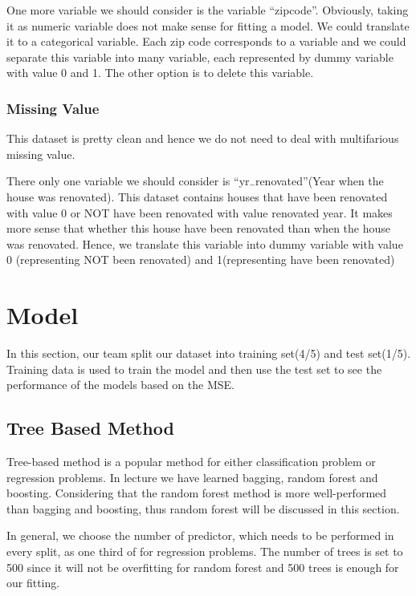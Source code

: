 \documentclass[12pt,twocolumn,twoside]{article}
\begin{document}
One more variable we should consider is the variable “zipcode”. Obviously, taking it as numeric variable does not make sense for fitting a model. We could translate it to a categorical variable. Each zip code corresponds to a variable and we could separate this variable into many variable, each represented by dummy variable with value 0 and 1. The other option is to delete this variable.
\subsubsection{Missing Value}
This dataset is pretty clean and hence we do not need to deal with multifarious missing value.

There only one variable we should consider is “yr$\rule{0.15cm}{0.1mm}$renovated”(Year when the house was renovated). This dataset contains houses that have been renovated with value 0 or NOT have been renovated with value renovated year. It makes more sense that whether this house have been renovated than when the house was renovated. Hence, we translate this variable into dummy variable with value 0 (representing NOT been renovated) and 1(representing have been renovated)
\section{Model}
In this section, our team split our dataset into training set(4/5) and test set(1/5). Training data is used to train the model and then use the test set to see the performance of the models based on the MSE.
\subsection{Tree Based Method}
Tree-based method is a popular method for either classification problem or regression problems. In lecture we have learned bagging, random forest and boosting. Considering that the random forest method is more well-performed than bagging and boosting, thus random forest will be discussed in this section.

In general, we choose the number of predictor, which needs to be performed in every split, as one third of for regression problems. The number of trees is set to 500 since it will not be overfitting for random forest and 500 trees is enough for our fitting.
\end{document}
